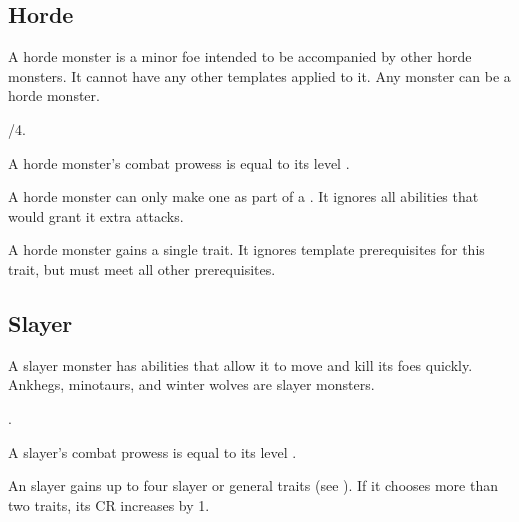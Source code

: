     \subsection{Horde}\label{Horde}
        A horde monster is a minor foe intended to be accompanied by other horde monsters.
        It cannot have any other templates applied to it.
        Any monster can be a horde monster.

         /4.

         A horde monster's combat prowess is equal to its level .

         A horde monster can only make one  as part of a .
        It ignores all abilities that would grant it extra attacks.

         A horde monster gains a single trait.
        It ignores template prerequisites for this trait, but must meet all other prerequisites.

    \subsection{Slayer}
        A slayer monster has abilities that allow it to move and kill its foes quickly.
        Ankhegs, minotaurs, and winter wolves are slayer monsters.

         .

         A slayer's combat prowess is equal to its level .

         An slayer gains up to four slayer or general traits (see ).
        If it chooses more than two traits, its CR increases by 1.
